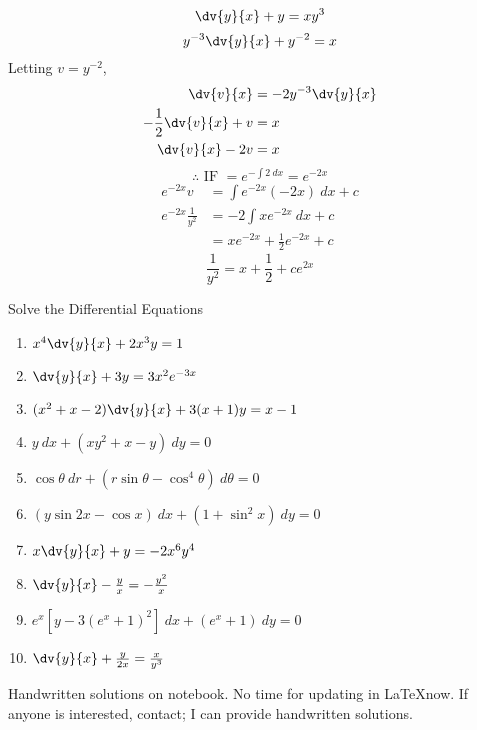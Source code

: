 \begin{example}{\[
    \dv{y}{x} + y = xy^3
\]}{}
    \[ y^{-3}\dv{y}{x} + y^{-2} = x \]
    Letting $v = y^{-2}$,
    \begin{align*}
        \dv{v}{x} &= -2y^{-3}\dv{y}{x} \\
        -\frac{1}{2}\dv{v}{x} + v &= x \\
        \dv{v}{x} - 2v &= x \\
    \end{align*}
    \[ \therefore \text{ IF } = e^{-\int{2} \: d{x}} = e^{-2x} \]
    \begin{align*}
        e^{-2x}v &= \int{ e^{-2x} (-2x) } \: d{x} + c \\
        e^{-2x}\frac{1}{y^2} &= -2 \int{ xe^{-2x} } \: d{x} + c \\
        &= xe^{-2x} + \frac{1}{2}e^{-2x} + c
    \end{align*}
    \[ \boxed{ \frac{1}{y^2} = x + \frac{1}{2} + ce^{2x} } \]
\end{example}

\begin{exercise}{
    Solve the Differential Equations
    \begin{enumerate}
        \item $ x^4\dv{y}{x} + 2x^3y = 1 $
        \item $ \dv{y}{x} + 3y = 3x^2e^{-3x} $
        \item $ (x^2+x-2)\dv{y}{x} + 3(x+1)y = x-1 $
        \item $ y \: d{x} + (xy^2+x-y) \: d{y} = 0 $
        \item $ \cos\theta \: d{r} + (r\sin\theta - \cos^4\theta) \: d{\theta} = 0 $
        \item $ (y\sin2x - \cos{x}) \: d{x} + (1+\sin^2x) \: d{y} = 0 $
        \item $ x\dv{y}{x} + y = -2x^6y^4 $
        \item $ \dv{y}{x} - \frac{y}{x} = -\frac{y^2}{x} $
        \item $ e^x\left[ y-3(e^x+1)^2 \right] \: d{x} + (e^x+1) \: d{y} = 0 $
        \item $ \dv{y}{x} + \frac{y}{2x} = \frac{x}{y^3} $
    \end{enumerate}
}{}
    Handwritten solutions on notebook. No time for updating in \LaTeX now. If anyone is interested, contact; I can provide handwritten solutions.
\end{exercise}

